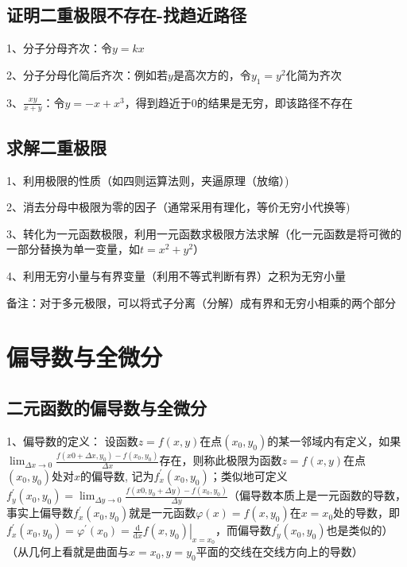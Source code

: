 \subsection{证明二重极限不存在-找趋近路径}

1、分子分母齐次：令$y=kx$

2、分子分母化简后齐次：例如若$y$是高次方的，令$y_1=y^2$化简为齐次

3、$\frac{xy}{x+y}$：令$y=-x+x^3$，得到趋近于0的结果是无穷，即该路径不存在



\subsection{求解二重极限}

1、利用极限的性质（如四则运算法则，夹逼原理（放缩）)

2、消去分母中极限为零的因子（通常采用有理化，等价无穷小代换等)

3、转化为一元函数极限，利用一元函数求极限方法求解（化一元函数是将可微的一部分替换为单一变量，如$t=x^2+y^2$）

4、利用无穷小量与有界变量（利用不等式判断有界）之积为无穷小量

备注：对于多元极限，可以将式子分离（分解）成有界和无穷小相乘的两个部分

\section{偏导数与全微分}



\subsection{二元函数的偏导数与全微分}

1、偏导数的定义： 设函数$z=f(x, y)$在点$\left(x_{0}, y_{0}\right)$的某一邻域内有定义，如果$\lim_{\Delta x \rightarrow 0} \frac{f\left(x{0}+\Delta x, y_{0}\right)-f\left(x_{0}, y_{0}\right)}{\Delta x}$存在，则称此极限为函数$z=f(x, y)$在点$\left(x_{0}, y_{0}\right)$处对$x$的偏导数, 记为$f_{x}^{\prime}\left(x_{0}, y_{0}\right)$；类似地可定义$f_{y}^{\prime}\left(x_{0}, y_{0}\right)=\lim_{\Delta y \rightarrow 0} \frac{f\left(x{0}, y_{0}+\Delta y\right)-f\left(x_{0}, y_{0}\right)}{\Delta y}$（偏导数本质上是一元函数的导数，事实上偏导数$f_{x}^{\prime}\left(x_{0}, y_{0}\right)$就是一元函数$\varphi(x)=f\left(x, y_{0}\right)$在$x=x_{0}$处的导数，即$f_{x}^{\prime}\left(x_{0}, y_{0}\right)=\varphi^{\prime}\left(x_{0}\right)=\left.\frac{\mathrm{d}}{\mathrm{d} x} f\left(x, y_{0}\right)\right|_{x=x_{0}}$，而偏导数$f_{y}^{\prime}\left(x_{0}, y_{0}\right)$也是类似的）（从几何上看就是曲面与$x=x_0,y=y_0$平面的交线在交线方向上的导数）

